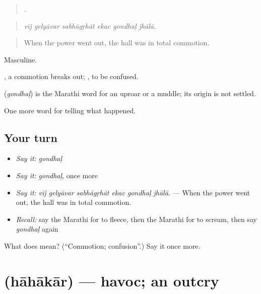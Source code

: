 \begin{quote}
     .
\end{quote}

\begin{quote}
\emph{vīj gelyāvar sabhāgṛhāt ekac gondhaḷ jhālā.}
\end{quote}

\begin{quote}
When the power went out, the hall was in total commotion.
\end{quote}

Masculine.

 , a commotion breaks out;  , to be confused.

\begin{cousinweb}
\textbf{} (\emph{gondhaḷ}) is the Marathi word for an uproar or a muddle; its origin is not settled.
\end{cousinweb}

\begin{grammarlens}[title={What you've built}]
One more word for telling what happened.
\end{grammarlens}

\subsection*{Your turn}
\begin{itemize}
\raggedright
  \item \emph{Say it:} \emph{gondhaḷ}
  \item \emph{Say it:} \emph{gondhaḷ}, once more
  \item \emph{Say it:} \emph{vīj gelyāvar sabhāgṛhāt ekac gondhaḷ jhālā.} — When the power went out, the hall was in total commotion.
  \item \emph{Recall:} say the Marathi for to fleece, then the Marathi for to scream, then say \emph{gondhaḷ} again
\end{itemize}

\begin{tcolorbox}[breakable,colback=teal!4,colframe=teal!35!black,title={Before you move on}]
What does  mean? (\textquotedblleft{}Commotion; confusion\textquotedblright{}.) Say it once more.
\end{tcolorbox}
\section[\texorpdfstring{\mr{हाहाकार} (hāhākār)}{हाहाकार (hāhākār)}]{ (hāhākār) — havoc; an outcry}

